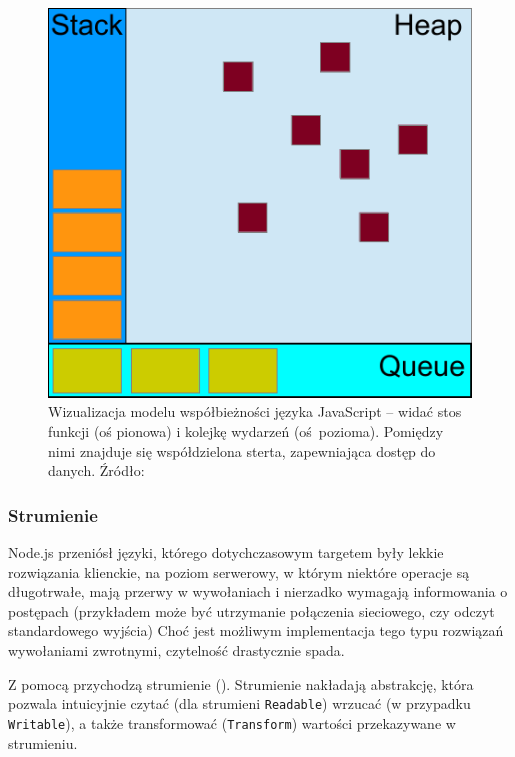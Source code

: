\begin{figure}[h]

    \centering
    \includegraphics[scale=0.6]{js-concurrency.pdf}

	\caption{Wizualizacja modelu współbieżności języka JavaScript -- widać stos funkcji (oś pionowa) i kolejkę wydarzeń (oś pozioma). Pomiędzy nimi znajduje się współdzielona sterta, zapewniająca dostęp do danych. Źródło: \cite{eventLoop}}

\end{figure}

\subsubsection{Strumienie}

Node.js przeniósł języki, którego dotychczasowym targetem były lekkie rozwiązania klienckie, na poziom serwerowy, w którym niektóre operacje są długotrwałe, mają przerwy w wywołaniach i nierzadko wymagają informowania o postępach (przykładem może być utrzymanie połączenia sieciowego, czy odczyt standardowego wyjścia) Choć jest możliwym implementacja tego typu rozwiązań  wywołaniami zwrotnymi, czytelność drastycznie spada.

Z pomocą przychodzą strumienie (\cite{nodeStreamAPI}). Strumienie nakładają abstrakcję, która pozwala intuicyjnie czytać (dla strumieni \texttt{Readable}) wrzucać (w przypadku \texttt{Writable}), a także transformować (\texttt{Transform}) wartości przekazywane w strumieniu.

